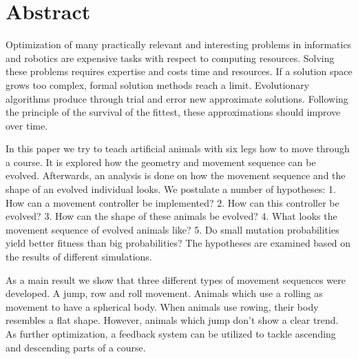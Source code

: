 %
%


\chapter{Abstract}

  Optimization of many practically relevant and
  interesting problems in informatics and robotics are expensive tasks with respect to computing resources.
  Solving these problems requires expertise and costs time and resources.
  If a solution space grows too complex, formal solution methods reach a limit.
  Evolutionary algorithms produce through trial and error new approximate solutions.
  Following the principle of the survival of the fittest, these approximations should improve over time.

  \medskip

  In this paper we try to teach artificial animals with six legs how to move through a course.
  It is explored how the geometry and movement sequence can be evolved.
  Afterwards, an analysis is done on how the movement sequence and the shape of an evolved individual looks.
  We postulate a number of hypotheses:
  1. How can a movement controller be implemented?
  2. How can this controller be evolved?
  3. How can the shape of these animals be evolved?
  4. What looks the movement sequence of evolved animals like?
  5. Do small mutation probabilities yield better fitness than big probabilities?
  The hypotheses are examined based on the results of different simulations.

  \medskip

  As a main result we show that three different types of movement sequences were developed.
  A jump, row and roll movement. Animals which use a rolling as movement to have a spherical body.
  When animals use rowing, their body resembles a flat shape. However, animals which jump don't show a clear trend.
  As further optimization, a feedback system can be utilized to tackle ascending and descending parts of a course.
